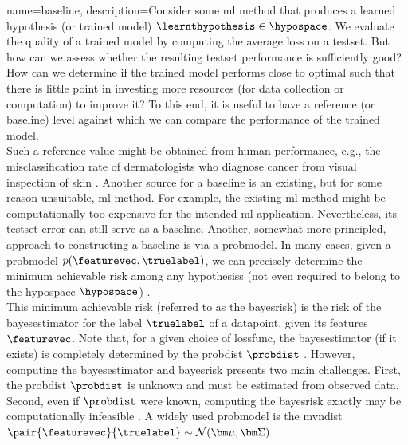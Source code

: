 {name={baseline},
	description={Consider some \gls{ml} method that produces a learned 
    		\gls{hypothesis} (or trained \gls{model}) $\learnthypothesis \in \hypospace$. We evaluate the quality of a trained \gls{model} 
    		by computing the average \gls{loss} on a \gls{testset}. But how can we assess 
    		whether the resulting \gls{testset} performance is sufficiently good? How can we 
    		determine if the trained \gls{model} performs close to optimal such that there is little point 
   		in investing more resources (for \gls{data} collection or computation) to improve it? 
    		To this end, it is useful to have a reference (or baseline) level against which 
    		we can compare the performance of the trained \gls{model}. \\
		Such a reference value might be obtained from human performance, e.g., the misclassification rate of dermatologists 
    		who diagnose cancer from visual inspection of skin \cite{SkinHumanAI}. Another source for a baseline is an existing, 
    		but for some reason unsuitable, \gls{ml} method. For example, the existing \gls{ml} method 
    		might be computationally too expensive for the intended \gls{ml} application. 
    		Nevertheless, its \gls{testset} error can still serve as a baseline. Another, somewhat more principled, 
    		approach to constructing a baseline is via a \gls{probmodel}. In many cases, given a \gls{probmodel} $p(\featurevec,\truelabel)$,  
    		we can precisely determine the \gls{minimum} achievable \gls{risk} among any \glspl{hypothesis}
    		(not even required to belong to the \gls{hypospace} $\hypospace$) \cite{LC}. \\
    		This \gls{minimum} achievable \gls{risk} (referred to as the \gls{bayesrisk}) is the \gls{risk} 
    		of the \gls{bayesestimator} for the \gls{label} $\truelabel$ of a \gls{datapoint}, given
    		its \glspl{feature} $\featurevec$. Note that, for a given choice of \gls{lossfunc}, the 
    		\gls{bayesestimator} (if it exists) is completely determined by the \gls{probdist} 
		$\probdist$ \cite[Ch. 4]{LC}. However, computing the \gls{bayesestimator} 
		and \gls{bayesrisk} presents two main challenges. First, the \gls{probdist} 
		$\probdist$ is unknown and must be estimated from observed \gls{data}. Second, even if $\probdist$ 
		were known, computing the \gls{bayesrisk} exactly may be computationally 
		infeasible \cite{cooper1990computational}. 
		A widely used \gls{probmodel} is the \gls{mvndist} $\pair{\featurevec}{\truelabel} \sim \mathcal{N}({\bm \mu},{\bm \Sigma})$ 
}}
